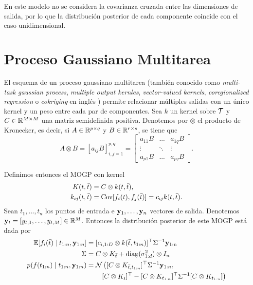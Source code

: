 En este modelo no se considera la covarianza cruzada entre las dimensiones de salida, por lo que la distribución posterior de cada componente coincide con el caso unidimensional.

\section{Proceso Gaussiano Multitarea}

El esquema de un proceso gaussiano multitarea \cite{43} (también conocido como \emph{multi-task gaussian process}, \emph{multiple output kernles}, \emph{vector-valued kernels}, \emph{coregionalized regression} o \emph{cokriging} en inglés \cite{46}) permite relacionar múltiples salidas con un único kernel y un peso entre cada par de componentes. Sea \(k\) un kernel sobre \(\mathcal{T}\) y \(C \in \mathbb{R}^{M \times M}\) una matriz semidefinida positiva. Denotemos por \(\otimes\) el producto de Kronecker, es decir, si \(A \in \mathbb{R}^{p \times q}\) y \(B \in \mathbb{R}^{r \times s}\), se tiene que
\begin{equation*}
	A \otimes B = [a_{ij}B]_{i,j=1}^{p,q} = \begin{bmatrix}
		a_{11}B	& \ldots	& a_{1q}B \\
		\vdots	& \ddots	& \vdots \\
		a_{p1}B	& \ldots	& a_{pq}B
	\end{bmatrix}.
\end{equation*}

Definimos entonces el MOGP con kernel
\begin{align*}
	K(t, \bar{t})		&= C \otimes k(t, \bar{t}), \\
	k_{ij}(t, \bar{t})	&= \operatorname{Cov}[f_{i}(t), f_{j}(\bar{t})] = c_{ij} k(t, \bar{t}).
\end{align*}
Sean \(t_{1}, \dotsc, t_{n}\) los puntos de entrada e \(\mathbf{y}_{1}, \dotsc, \mathbf{y}_{n}\) vectores de salida. Denotemos \(\mathbf{y}_{t} = [y_{t,1}, \dotsc ,y_{t,M}] \in \mathbb{R}^{M}\). Entonces la distribución posterior de este MOGP está dada por
\begin{align*}
	\mathbb{E}[f_{i}(\bar{t}) \mid t_{1:n}, \mathbf{y}_{1:n}]	&= [c_{i, 1:D} \otimes k(\bar{t}, t_{1:n})]^{\top} \Sigma^{-1} \mathbf{y}_{1:n} \\
	\Sigma											&= C \otimes K_{\bar{t}} + \operatorname{diag}(\sigma_{1:d}^{2}) \otimes I_{n} \\
	p(f(t_{1:n}) \mid t_{1:n}, \mathbf{y}_{1:n})			&= \mathcal{N}\left( [C \otimes K_{\bar{t}, t_{1:n}}]^{\top} \Sigma^{-1} \mathbf{y}_{1:n}, \right.\\
													&\left. \qquad [C \otimes K_{\bar{t}}]^{\top} - [C \otimes K_{t_{1:n}}]^{\top} \Sigma^{-1} [C \otimes K_{t_{1:n}}]\right)
\end{align*}

